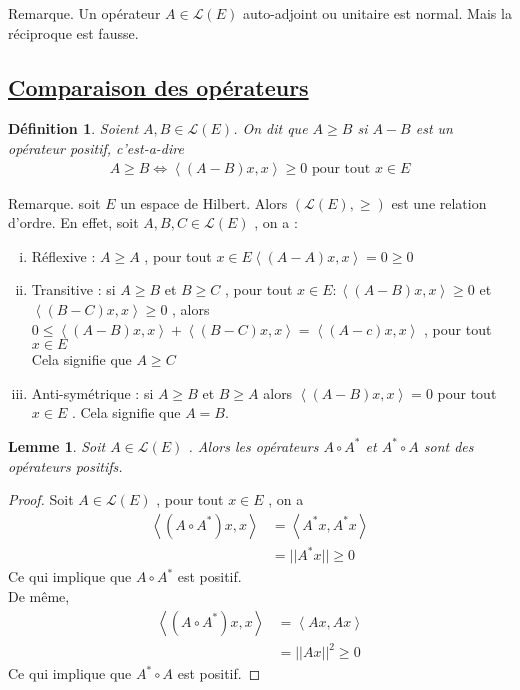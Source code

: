 \documentclass{report}
\newtheorem{Def}{Définition}[subsection]
\newtheorem{Lem}{Lemme}[subsection]
\begin{document}
{Remarque.  Un opérateur $A \in \mathscr{L}(E)$ auto-adjoint ou unitaire est normal. Mais la réciproque est fausse.\\

\subsection{\underline{Comparaison des opérateurs}}

\begin{Def} Soient $A,B \in \mathscr{L}(E)$. On dit que $A \ge B$ si $A - B$ est un opérateur positif, c'est-a-dire
					\begin{align*}
					 A \ge B \Longleftrightarrow  \left< (A-B)x,x \right> \ge 0  \,\,\text{pour tout}\,\, x \in E 
					\end{align*}
\end{Def}

Remarque. soit $E$ un espace de Hilbert. Alors $(\mathscr{L}(E), \ge)$ est une relation d'ordre. En effet, soit $A, B, C \in \mathscr{L}(E)$ , on a : 
	\begin{enumerate}[i)]
	\item Réflexive : $A \ge A$ , pour tout $x \in E \left< (A-A)x,x \right> = 0 \ge 0 $ \\
	\item Transitive : si $A \ge B$ et $B \ge C$ , pour tout $x \in E : \left< (A-B)x,x \right> \ge 0$ et $\left< (B-C)x,x \right> \ge 0$ , alors \\
						 $0 \le \left< (A-B)x,x \right> + \left< (B-C)x,x \right> = \left< (A-c)x,x \right> $ , pour tout $x \in E$ \\
						Cela signifie que $A \ge C$ \\
	\item Anti-symétrique : si $A \ge B$ et $B \ge A$ alors $\left< (A-B)x,x \right> = 0$ pour tout $x \in E$ . Cela signifie que $A = B$.
	\end{enumerate}

\begin{Lem}\label{Lem:note1} Soit $A \in \mathscr{L}(E)$ . Alors les opérateurs $A\circ A^*$ et $A^*\circ A$ sont des opérateurs positifs. \\
\end{Lem}
\begin{proof}
\fbox{*} Soit $A \in \mathscr{L}(E)$ , pour tout $x \in E$ , on a 
					\begin{align*}
					 \left< (A\circ A^*)x,x \right> &= \left< A^*x,A^*x \right> \\
					 &= ||A^*x|| \ge 0
					\end{align*}
Ce qui implique que $A\circ A^*$ est positif.\\ 
\fbox{*} De même, 
					\begin{align*}
					 \left< (A\circ A^*)x,x \right> &= \left< Ax,Ax \right> \\
					 &= ||Ax||^2 \ge 0 
					\end{align*}
Ce qui implique que $A^* \circ A$ est positif.
\end{proof}


}
\end{document}
